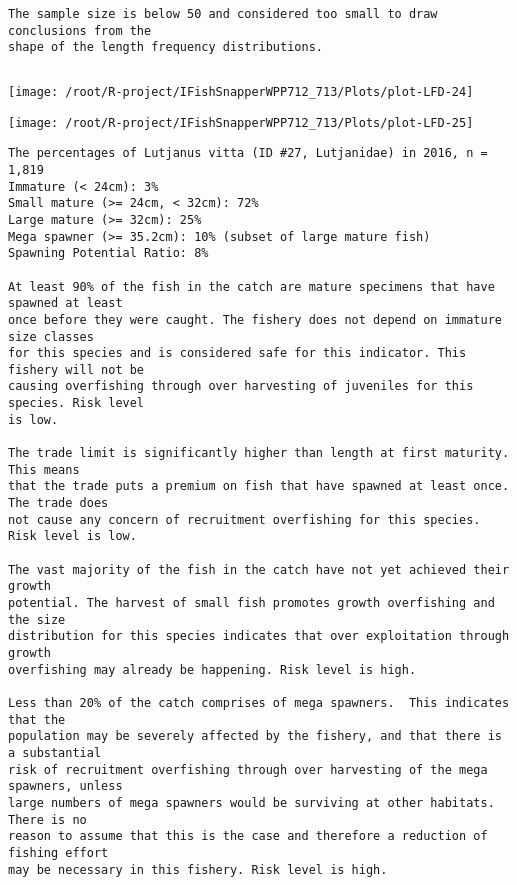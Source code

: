 \documentclass{report}\usepackage[]{graphicx}\usepackage[]{color}
\makeatletter
\def\maxwidth{ %
  \ifdim\Gin@nat@width>\linewidth
    \linewidth
  \else
    \Gin@nat@width
  \fi
}
\newenvironment{kframe}{%
 \def\at@end@of@kframe{}%
 \ifinner\ifhmode%
  \def\at@end@of@kframe{\end{minipage}}%
  \begin{minipage}{\columnwidth}%
 \fi\fi%
 \def\FrameCommand##1{\hskip\@totalleftmargin \hskip-\fboxsep
 \colorbox{shadecolor}{##1}\hskip-\fboxsep
     \hskip-\linewidth \hskip-\@totalleftmargin \hskip\columnwidth}%
 \MakeFramed {\advance\hsize-\width
   \@totalleftmargin\z@ \linewidth\hsize
   \@setminipage}}%
 {\par\unskip\endMakeFramed%
 \at@end@of@kframe}
\newenvironment{knitrout}{}{} %
\makeatother
\begin{document}
\begin{knitrout}
\begin{kframe}
\begin{verbatim}
The sample size is below 50 and considered too small to draw conclusions from the
shape of the length frequency distributions.
\end{verbatim}
\end{kframe}
\newpage
\begin{kframe}\begin{verbatim}
\end{verbatim}
\end{kframe}
\texttt{[image: /root/R-project/IFishSnapperWPP712\_713/Plots/plot-LFD-24]} 

\texttt{[image: /root/R-project/IFishSnapperWPP712\_713/Plots/plot-LFD-25]} 
\begin{kframe}\begin{verbatim}
The percentages of Lutjanus vitta (ID #27, Lutjanidae) in 2016, n = 1,819
Immature (< 24cm): 3%
Small mature (>= 24cm, < 32cm): 72%
Large mature (>= 32cm): 25%
Mega spawner (>= 35.2cm): 10% (subset of large mature fish)
Spawning Potential Ratio: 8%
 
At least 90% of the fish in the catch are mature specimens that have spawned at least
once before they were caught. The fishery does not depend on immature size classes
for this species and is considered safe for this indicator. This fishery will not be
causing overfishing through over harvesting of juveniles for this species. Risk level
is low.

The trade limit is significantly higher than length at first maturity.  This means
that the trade puts a premium on fish that have spawned at least once. The trade does
not cause any concern of recruitment overfishing for this species. Risk level is low.

The vast majority of the fish in the catch have not yet achieved their growth
potential. The harvest of small fish promotes growth overfishing and the size
distribution for this species indicates that over exploitation through growth
overfishing may already be happening. Risk level is high.

Less than 20% of the catch comprises of mega spawners.  This indicates that the
population may be severely affected by the fishery, and that there is a substantial
risk of recruitment overfishing through over harvesting of the mega spawners, unless
large numbers of mega spawners would be surviving at other habitats. There is no
reason to assume that this is the case and therefore a reduction of fishing effort
may be necessary in this fishery. Risk level is high.
 

\end{verbatim}
\end{kframe}
\end{knitrout}
\end{document}
